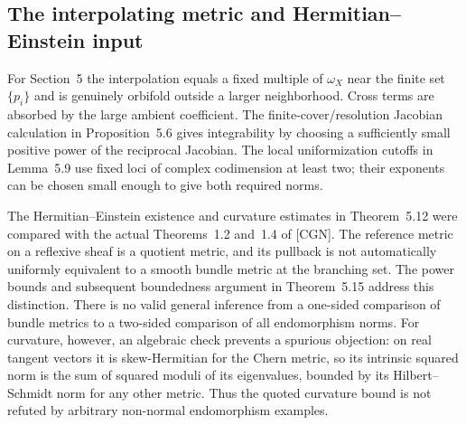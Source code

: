 \documentclass[10pt]{article}
\begin{document}
\subsection*{The interpolating metric and Hermitian–Einstein input}
For Section 5 the interpolation equals a fixed multiple of \(\omega_X\) near the finite set \(\{p_i\}\) and is genuinely orbifold outside a larger neighborhood. Cross terms are absorbed by the large ambient coefficient. The finite-cover/resolution Jacobian calculation in Proposition 5.6 gives integrability by choosing a sufficiently small positive power of the reciprocal Jacobian. The local uniformization cutoffs in Lemma 5.9 use fixed loci of complex codimension at least two; their exponents can be chosen small enough to give both required norms.\par
The Hermitian–Einstein existence and curvature estimates in Theorem 5.12 were compared with the actual Theorems 1.2 and 1.4 of [CGN]. The reference metric on a reflexive sheaf is a quotient metric, and its pullback is not automatically uniformly equivalent to a smooth bundle metric at the branching set. The power bounds and subsequent boundedness argument in Theorem 5.15 address this distinction. There is no valid general inference from a one-sided comparison of bundle metrics to a two-sided comparison of all endomorphism norms. For curvature, however, an algebraic check prevents a spurious objection: on real tangent vectors it is skew-Hermitian for the Chern metric, so its intrinsic squared norm is the sum of squared moduli of its eigenvalues, bounded by its Hilbert–Schmidt norm for any other metric. Thus the quoted curvature bound is not refuted by arbitrary non-normal endomorphism examples.\par
\end{document}
